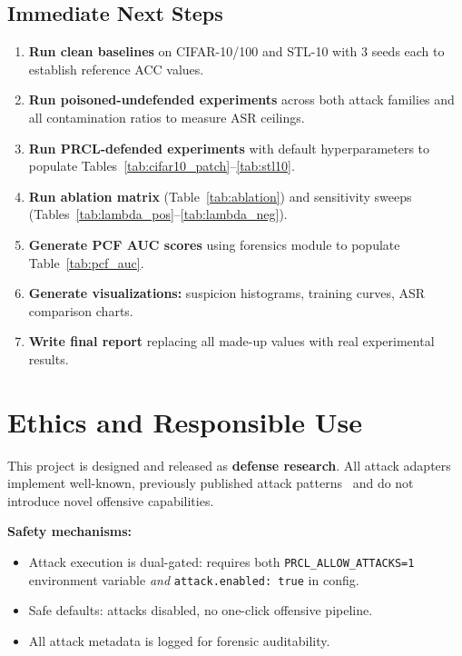 \documentclass[11pt,a4paper]{article}
\begin{document}
\subsection{Immediate Next Steps}

\begin{enumerate}
  \item \textbf{Run clean baselines} on CIFAR-10/100 and STL-10 with 3 seeds
    each to establish reference ACC values.
  \item \textbf{Run poisoned-undefended experiments} across both attack families
    and all contamination ratios to measure ASR ceilings.
  \item \textbf{Run PRCL-defended experiments} with default hyperparameters to
    populate Tables~\ref{tab:cifar10_patch}--\ref{tab:stl10}.
  \item \textbf{Run ablation matrix} (Table~\ref{tab:ablation}) and sensitivity
    sweeps (Tables~\ref{tab:lambda_pos}--\ref{tab:lambda_neg}).
  \item \textbf{Generate PCF AUC scores} using forensics module to populate
    Table~\ref{tab:pcf_auc}.
  \item \textbf{Generate visualizations:} suspicion histograms, training curves,
    ASR comparison charts.
  \item \textbf{Write final report} replacing all made-up values with real
    experimental results.
\end{enumerate}


\section{Ethics and Responsible Use}
\label{sec:ethics}

This project is designed and released as \textbf{defense research}.  All attack
adapters implement well-known, previously published attack
patterns~\cite{gu2017badnets} and do not introduce novel offensive capabilities.

\textbf{Safety mechanisms:}
\begin{itemize}[nosep]
  \item Attack execution is dual-gated: requires both
    \texttt{PRCL\_ALLOW\_ATTACKS=1} environment variable \emph{and}
    \texttt{attack.enabled:~true} in config.
  \item Safe defaults: attacks disabled, no one-click offensive pipeline.
  \item All attack metadata is logged for forensic auditability.
\end{itemize}
\end{document}
